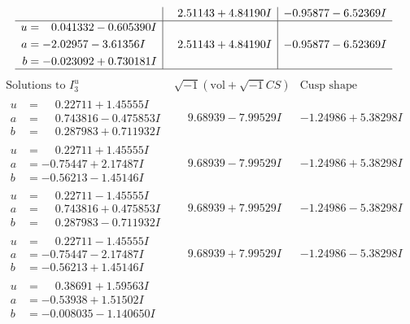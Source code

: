 \documentclass[1p]{elsarticle_modified}
\theoremstyle{definition}
\newcommand{\I}{\sqrt{-1}}
\begin{document}
$$\begin{array}{c|c|c}
 & \phantom{-}2.51143 + 4.84190 I & -0.95877 - 6.52369 I \\ \hline\begin{aligned}
u &= \phantom{-}0.041332 - 0.605390 I \\
a &= -2.02957 - 3.61356 I \\
b &= -0.023092 + 0.730181 I\end{aligned}
 & \phantom{-}2.51143 + 4.84190 I & -0.95877 - 6.52369 I\\
 \hline 
 \end{array}$$\newpage$$\begin{array}{c|c|c}  
\text{Solutions to }I^u_{3}& \I (\text{vol} + \sqrt{-1}CS) & \text{Cusp shape}\\
 \hline 
\begin{aligned}
u &= \phantom{-}0.22711 + 1.45555 I \\
a &= \phantom{-}0.743816 - 0.475853 I \\
b &= \phantom{-}0.287983 + 0.711932 I\end{aligned}
 & \phantom{-}9.68939 - 7.99529 I & -1.24986 + 5.38298 I \\ \hline\begin{aligned}
u &= \phantom{-}0.22711 + 1.45555 I \\
a &= -0.75447 + 2.17487 I \\
b &= -0.56213 - 1.45146 I\end{aligned}
 & \phantom{-}9.68939 - 7.99529 I & -1.24986 + 5.38298 I \\ \hline\begin{aligned}
u &= \phantom{-}0.22711 - 1.45555 I \\
a &= \phantom{-}0.743816 + 0.475853 I \\
b &= \phantom{-}0.287983 - 0.711932 I\end{aligned}
 & \phantom{-}9.68939 + 7.99529 I & -1.24986 - 5.38298 I \\ \hline\begin{aligned}
u &= \phantom{-}0.22711 - 1.45555 I \\
a &= -0.75447 - 2.17487 I \\
b &= -0.56213 + 1.45146 I\end{aligned}
 & \phantom{-}9.68939 + 7.99529 I & -1.24986 - 5.38298 I \\ \hline\begin{aligned}
u &= \phantom{-}0.38691 + 1.59563 I \\
a &= -0.53938 + 1.51502 I \\
b &= -0.008035 - 1.140650 I\end{aligned}

\end{array}$$
\end{document}
